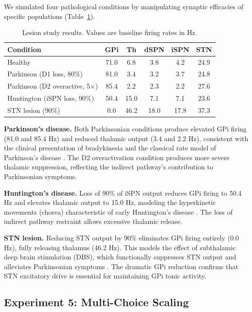\documentclass[11pt,a4paper]{article}
\begin{document}
We simulated four pathological conditions by manipulating synaptic efficacies of specific populations (Table~\ref{tab:lesions}).

\begin{table}[h]
\centering
\caption{Lesion study results. Values are baseline firing rates in Hz.}
\label{tab:lesions}
\begin{tabular}{lccccc}
\toprule
Condition & GPi & Th & dSPN & iSPN & STN \\
\midrule
Healthy & 71.0 & 6.8 & 3.8 & 4.2 & 24.9 \\
Parkinson (D1 loss, 80\%) & 81.0 & 3.4 & 3.2 & 3.7 & 24.8 \\
Parkinson (D2 overactive, 5$\times$) & 85.4 & 2.2 & 2.3 & 2.2 & 27.6 \\
Huntington (iSPN loss, 90\%) & 50.4 & 15.0 & 7.1 & 7.1 & 23.6 \\
STN lesion (90\%) & 0.0 & 46.2 & 18.0 & 17.8 & 37.3 \\
\bottomrule
\end{tabular}
\end{table}

\textbf{Parkinson's disease.} Both Parkinsonian conditions produce elevated GPi firing (81.0 and 85.4 Hz) and reduced thalamic output (3.4 and 2.2 Hz), consistent with the clinical presentation of bradykinesia and the classical rate model of Parkinson's disease \citep{delong1990}. The D2 overactivation condition produces more severe thalamic suppression, reflecting the indirect pathway's contribution to Parkinsonian symptoms.

\textbf{Huntington's disease.} Loss of 90\% of iSPN output reduces GPi firing to 50.4 Hz and elevates thalamic output to 15.0 Hz, modeling the hyperkinetic movements (chorea) characteristic of early Huntington's disease \citep{albin1989}. The loss of indirect pathway restraint allows excessive thalamic release.

\textbf{STN lesion.} Reducing STN output by 90\% eliminates GPi firing entirely (0.0 Hz), fully releasing thalamus (46.2 Hz). This models the effect of subthalamic deep brain stimulation (DBS), which functionally suppresses STN output and alleviates Parkinsonian symptoms \citep{limousin1998}. The dramatic GPi reduction confirms that STN excitatory drive is essential for maintaining GPi tonic activity.

\subsection{Experiment 5: Multi-Choice Scaling}
\end{document}
